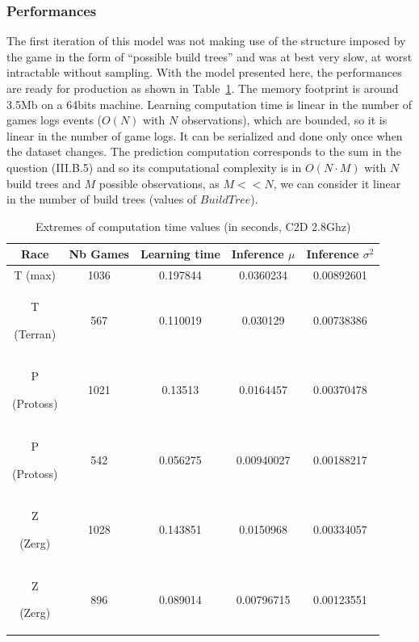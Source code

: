 \subsubsection{Performances}
The first iteration of this model was not making use of the structure imposed by the game in the form of ``possible build trees'' and was at best very slow, at worst intractable without sampling. With the model presented here, the performances are ready for production as shown in Table~\ref{CPU}. The memory footprint is around 3.5Mb on a 64bits machine. Learning computation time is linear in the number of games logs events ($O(N)$ with $N$ observations), which are bounded, so it is linear in the number of game logs. It can be serialized and done only once when the dataset changes. The prediction computation corresponds to the sum in the question (III.B.5) and so its computational complexity is in $O(N\cdot M)$ with $N$ build trees and $M$ possible observations, as $M << N$, we can consider it linear in the number of build trees (values of $BuildTree$).

\begin{table}[h]
\caption{Extremes of computation time values (in seconds, C2D 2.8Ghz)}
\vspace{-0.5cm}
\begin{center}
\begin{tabular}{|c|cc|cc|}
\hline
Race
& Nb Games
& Learning time
& Inference $\mu$
& Inference $\sigma^2$ \\ \hline
T (max) & 1036 & 0.197844 & 0.0360234 & 0.00892601 \\
T \begin{tiny}(Terran)\end{tiny} & 567 & 0.110019 & 0.030129 & 0.00738386 \\ 
P \begin{tiny}(Protoss)\end{tiny} & 1021 & 0.13513 & 0.0164457 & 0.00370478 \\
P \begin{tiny}(Protoss)\end{tiny} & 542 & 0.056275 & 0.00940027 & 0.00188217 \\ 
Z \begin{tiny}(Zerg)\end{tiny} & 1028 & 0.143851 & 0.0150968 & 0.00334057 \\
Z \begin{tiny}(Zerg)\end{tiny} & 896 & 0.089014 & 0.00796715 & 0.00123551 \\ \hline
\end{tabular}
\label{CPU}
\end{center}
\end{table}

